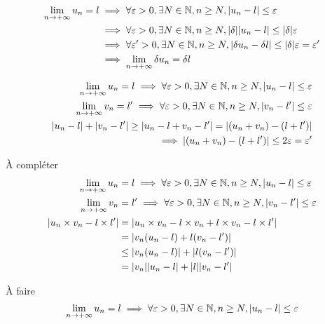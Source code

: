 \documentclass[a4paper, 12pt]{article}
\begin{document}
\begin{demonstration}

    \begin{align*}
        \lim_{n \to +\infty} u_n = l &\implies \forall \varepsilon > 0, \exists N \in \mathbb{N}, n \geq N, |u_n - l| \leq \varepsilon \\
        &\implies \forall \varepsilon > 0, \exists N \in \mathbb{N}, n \geq N, |\delta|| u_n - l|  \leq |\delta|\varepsilon \\
        &\implies \forall \varepsilon' > 0, \exists N \in \mathbb{N}, n \geq N, |\delta u_n - \delta l|  \leq |\delta|\varepsilon = \varepsilon' \\
        &\implies \lim_{n \to +\infty} \delta u_n = \delta l 
    \end{align*}

    \begin{align*}
        \lim_{n \to +\infty} u_n = l \implies \forall \varepsilon > 0, \exists N \in \mathbb{N}, n \geq N, |u_n - l| \leq \varepsilon \\
        \lim_{n \to +\infty} v_n = l' \implies \forall \varepsilon > 0, \exists N \in \mathbb{N}, n \geq N, |v_n - l'| \leq \varepsilon \\
        |u_n - l| + |v_n - l'| \geq |u_n - l + v_n - l'| = |(u_n + v_n) - (l + l')| \\
        \implies |(u_n + v_n) - (l + l')| \leq 2 \varepsilon = \varepsilon'
    \end{align*}

    \color{red}
    À compléter
    \color{black}
    \begin{align*}
        \lim_{n \to +\infty} u_n &= l \implies \forall \varepsilon > 0, \exists N \in \mathbb{N}, n \geq N, |u_n - l| \leq \varepsilon \\
        \lim_{n \to +\infty} v_n &= l' \implies \forall \varepsilon > 0, \exists N \in \mathbb{N}, n \geq N, |v_n - l'| \leq \varepsilon \\
        |u_n \times v_n - l \times l'| &= |u_n \times v_n - l \times v_n + l \times v_n - l \times l'| \\
        &= |v_n (u_n - l) + l (v_n - l')| \\
        &\leq |v_n (u_n - l)| + |l (v_n - l')| \\
        &= |v_n| |u_n - l| + |l| |v_n - l'|\\
    \end{align*}

    \color{red}
    À faire
    \color{black}
    \begin{align*}
        \lim_{n \to +\infty} u_n = l &\implies \forall \varepsilon > 0, \exists N \in \mathbb{N}, n \geq N, |u_n - l| \leq \varepsilon \\
    \end{align*}

\end{demonstration}
\end{document}
